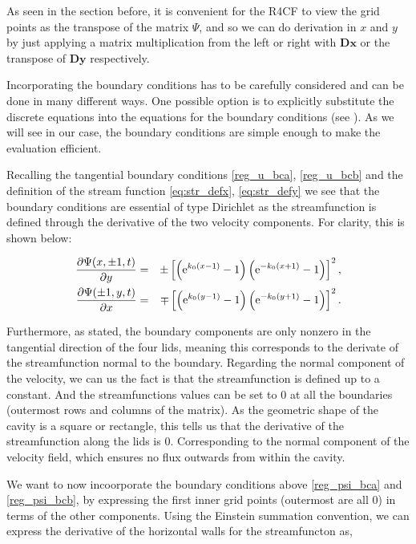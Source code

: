 As seen in the section before, it is convenient for the R4CF to view the grid
points as the transpose of the matrix $\Psi$, and so we can do derivation in
$x$ and $y$ by just applying a matrix multiplication from the left or right
with $\mathbf{Dx}$ or the transpose of $\mathbf{Dy}$ respectively. 

Incorporating the boundary conditions has to be carefully considered and can be
done in many different ways. One possible option is to explicitly substitute
the discrete equations into the equations for the boundary conditions (see
\cite{meseguer2020}). As we will see in our case, the boundary conditions are
simple enough to make the evaluation efficient.

Recalling the tangential boundary conditions \eqref{reg_u_bca},
\eqref{reg_u_bcb} and the definition of the stream function
\eqref{eq:str_defx}, \eqref{eq:str_defy} we see that the boundary conditions
are essential of type Dirichlet as the streamfunction is defined through the
derivative of the two velocity components. For clarity, this is shown below:

\begin{eqnarray}
\frac{\partial\Psi(x,\pm 1,t)}{\partial y} & = & \pm\left[\left(\mathrm{e}^{k_0(x - 1)} - 1\right)
  \left(\mathrm{e}^{-k_0(x + 1)} - 1\right)\right]^2,\label{reg_psi_bca} \\
  \frac{\partial\Psi(\pm 1,y,t)}{\partial x} & = & \mp\left[\left(\mathrm{e}^{k_0(y - 1)} - 1\right)
  \left(\mathrm{e}^{-k_0(y + 1)} - 1\right)\right]^2.\label{reg_psi_bcb}
\end{eqnarray}

Furthermore, as stated, the boundary components are only nonzero in the
tangential direction of the four lids, meaning this corresponds to the derivate
of the streamfunction normal to the boundary. Regarding the normal component of
the velocity, we can us the fact is that the streamfunction is defined up to a
constant. And the streamfunctions values can be set to $0$ at all the
boundaries (outermost rows and columns of the matrix). As the geometric shape
of the cavity is a square or rectangle, this tells us that the derivative of
the streamfunction along the lids is $0$. Corresponding to the normal component
of the velocity field, which ensures no flux outwards from within the cavity.

We want to now incoorporate the boundary conditions above \eqref{reg_psi_bca}
and \eqref{reg_psi_bcb}, by expressing the first inner grid points (outermost
are all $0$) in terms of the other components. Using the Einstein summation
convention, we can express the derivative of the horizontal walls for the
streamfuncton as,


